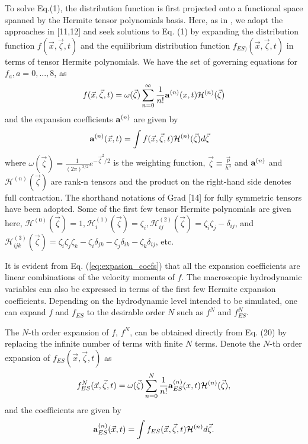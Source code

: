 \documentclass[doublecol]{epl2}
\begin{document}
To solve Eq.(1), the distribution function is first projected onto a functional space spanned by the Hermite tensor polynomials basis.
Here, as in \cite{Yang2009}, we adopt the approaches in [11,12] and seek solutions to Eq. (1) by expanding the distribution function $f(\vec x,\vec \zeta, t)$ and the equilibrium distribution function $f_{ES)}(\vec x, \vec\zeta, t)$ in terms of tensor Hermite polynomials. We have the set of governing equations for $f_a, a=0, ..., 8$, as
\begin{align}
 f(\vec x,\vec\zeta ,t) =\omega (\vec\zeta )\sum _{n=0}^{\infty}
\frac{1}{n!} {\bf a}^{(n)}(x,t) {{\mathcal H}}^{(n)} (\vec\zeta )
\end{align}
and the expansion coefficients ${\bf a}^{(n)}$ are given by
\begin{align}
{\bf a}^{(n)} (\vec x,t)&=\int f(\vec x,\vec\zeta ,t) {{\mathcal H}}^{(n)}(\vec\zeta) d\vec\zeta
\label{eq:expasion_coefs}
\end{align}
where $\omega (\vec\zeta) = \frac{1}{(2\pi)^{3/2} } e^{-\vec\zeta^2/2}$ is the weighting function, $\vec\zeta \equiv \frac{\vec p}{h^3}$ and ${\bf a}^{(n)}$ and ${{\mathcal H} }^{(n)} (\vec\zeta )$ are rank-n tensors and the product on the right-hand side denotes full contraction.   The shorthand notations of Grad [14] for fully symmetric tensors have been adopted.
Some of the first few tensor Hermite polynomials are given here, ${{\mathcal H}}^{(0)} (\vec\zeta ) = 1, {{\mathcal H}} _{i}^{(1)} (\vec\zeta )=\zeta _{i}, {{\mathcal H}}_{ij}^{(2)} (\vec\zeta ) =\zeta _{i} \zeta _{j} - \delta _{ij}$, and ${{\mathcal H}}_{ijk}^{(3)} (\vec\zeta ) =\zeta _{i} \zeta _{j} \zeta _{k}-\zeta _{i}\delta_{jk} -\zeta _{j}\delta _{ik} -\zeta _{k} \delta _{ij}$, etc.

It is evident from Eq. (\ref{eq:expasion_coefs}) that all the expansion coefficients are linear combinations of the velocity moments of $f$.  The macroscopic hydrodynamic variables can also be expressed in terms of the first few Hermite expansion coefficients.  Depending on the hydrodynamic level intended to be simulated, one can expand $f$ and $f_{ES}$ to the desirable order $N$ such as $f^N$ and $f_{ES}^N$.

The $N$-th order expansion of $f$, $f^N$, can be obtained directly from Eq. (20) by replacing the infinite number of terms with finite $N$ terms.  Denote the $N$-th order expansion of $f_{ES}(\vec x,\vec\zeta ,t)$ as
\begin{align}
 f^N_{ES}(\vec x,\vec\zeta ,t) =\omega (\vec\zeta )\sum _{n=0}^N
\frac{1}{n!} {\bf a}^{(n)}_{ES}(x,t) {{\mathcal H}}^{(n)} (\vec\zeta ),
\end{align}
and the coefficients are given by
\begin{align}
{\bf a}^{(n)}_{ES} (\vec x,t)=\int f_{ES}(\vec x,\vec\zeta ,t) {{\mathcal H}}^{(n)} d\vec\zeta.
\end{align}
\end{document}

